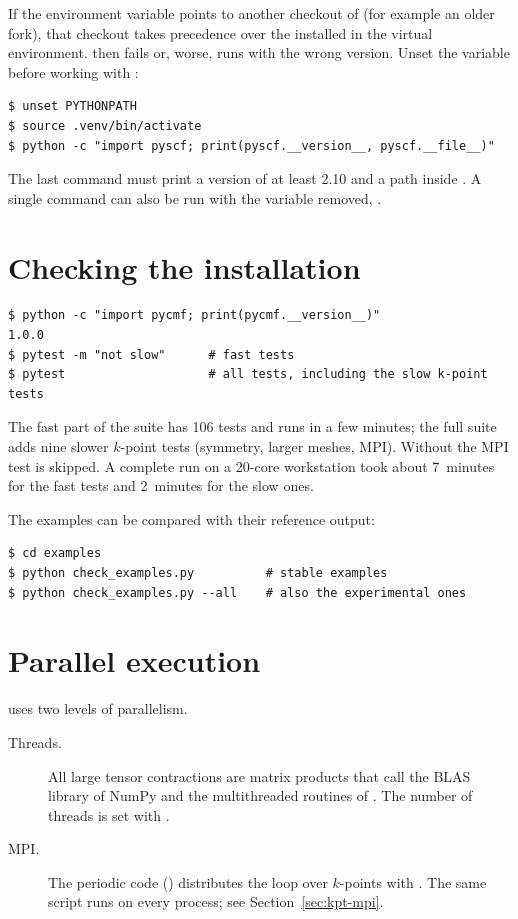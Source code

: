 If the environment variable  points to another checkout of
\pyscf{} (for example an older fork), that checkout takes precedence over the
\pyscf{} installed in the virtual environment. \pycmf{} then fails or, worse,
runs with the wrong version. Unset the variable before working with
\pycmf{}:

\begin{lstlisting}[style=shell]
$ unset PYTHONPATH
$ source .venv/bin/activate
$ python -c "import pyscf; print(pyscf.__version__, pyscf.__file__)"
\end{lstlisting}

The last command must print a version of at least 2.10 and a path inside
. A single command can also be run with the variable removed,
.

\section{Checking the installation}

\begin{lstlisting}[style=shell]
$ python -c "import pycmf; print(pycmf.__version__)"
1.0.0
$ pytest -m "not slow"      # fast tests
$ pytest                    # all tests, including the slow k-point tests
\end{lstlisting}

The fast part of the suite has 106 tests and runs in a few minutes; the full
suite adds nine slower $k$-point tests (symmetry, larger meshes, MPI). Without
 the MPI test is skipped. A complete run on a 20-core
workstation took about 7~minutes for the fast tests and 2~minutes for the slow
ones.

The examples can be compared with their reference output:

\begin{lstlisting}[style=shell]
$ cd examples
$ python check_examples.py          # stable examples
$ python check_examples.py --all    # also the experimental ones
\end{lstlisting}

\section{Parallel execution}

\pycmf{} uses two levels of parallelism.

\begin{description}
  \item[Threads.] All large tensor contractions are matrix products that call
        the BLAS library of NumPy and the multithreaded routines of \pyscf{}.
        The number of threads is set with .
  \item[MPI.] The periodic code () distributes the loop over
        $k$-points with . The same script runs on every
        process; see Section~\ref{sec:kpt-mpi}.
\end{description}

